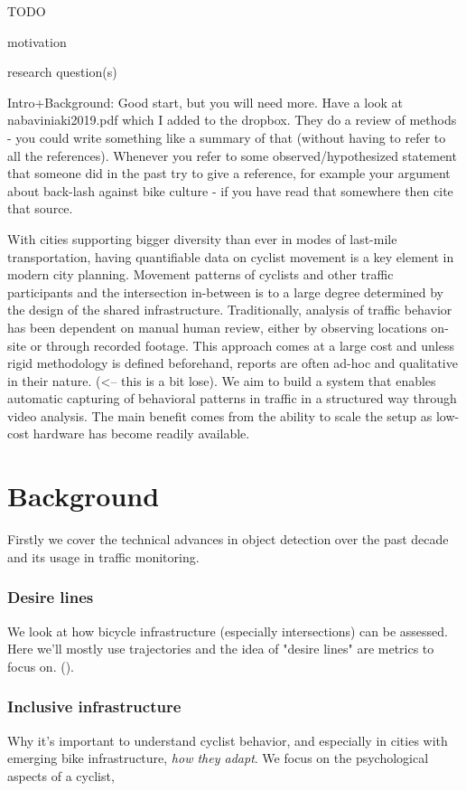 \documentclass[
10pt, %
a4paper, %
oneside, %
headinclude,footinclude, %
] {book}%
\begin{document}
TODO

motivation

research question(s)

Intro+Background: Good start, but you will need more. Have a look at nabaviniaki2019.pdf which I added to the dropbox. 
They do a review of methods - you could write something like a summary of that (without having to refer to all the references). 
Whenever you refer to some observed/hypothesized statement that someone did in the past try to give a reference, 
for example your argument about back-lash against bike culture - if you have read that somewhere then cite that source.

With cities supporting bigger diversity than ever in modes of last-mile transportation,
having quantifiable data on cyclist movement is a key element in modern city planning. 
Movement patterns of cyclists and other traffic participants and the intersection in-between 
is to a large degree determined by the design of the shared infrastructure. 
Traditionally, analysis of traffic behavior has been dependent on manual human review, either by 
observing locations on-site or through recorded footage. This approach comes at a large cost 
and unless rigid methodology is defined beforehand, reports are often ad-hoc and qualitative in 
their nature. (<-- this is a bit lose). We aim to build a system that enables automatic capturing of behavioral 
patterns in traffic in a structured way through video analysis. The main benefit comes from the ability to 
scale the setup as low-cost hardware has become readily available.

\clearpage

\chapter{Background}

Firstly we cover the technical advances in object detection over the past decade and its usage in traffic monitoring.

\subsection{Desire lines}
We look at how bicycle infrastructure (especially intersections) can be assessed. Here we'll mostly use 
trajectories and the idea of "desire lines" are metrics to focus on. (\cite{situ}). 



\subsection{Inclusive infrastructure}
Why it's important to understand cyclist behavior, and especially in cities with emerging bike infrastructure, \textit{how they adapt}.
We focus on the psychological aspects of a cyclist,
\end{document}

